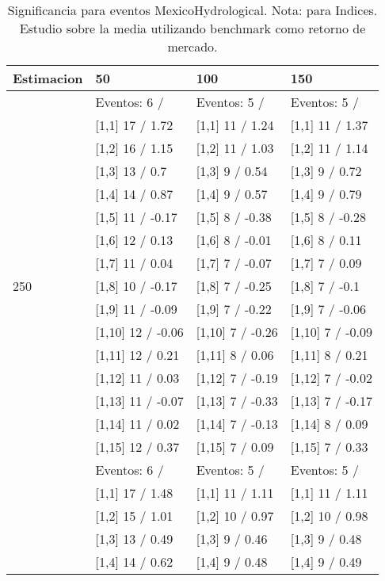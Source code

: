 \begin{table}

\caption{Significancia para eventos MexicoHydrological. Nota: para Indices. Estudio sobre la media utilizando benchmark como retorno de mercado.}
\centering
\begin{tabular}[t]{llll}
\toprule
Estimacion & 50 & 100 & 150\\
\midrule
 & Eventos:  6 / & Eventos:  5 / & Eventos:  5 /\\
 & {}[1,1] 17  / 1.72 & {}[1,1] 11  / 1.24 & {}[1,1] 11  / 1.37\\
 & {}[1,2] 16  / 1.15 & {}[1,2] 11  / 1.03 & {}[1,2] 11  / 1.14\\
 & {}[1,3] 13  / 0.7 & {}[1,3] 9  / 0.54 & {}[1,3] 9  / 0.72\\
 & {}[1,4] 14  / 0.87 & {}[1,4] 9  / 0.57 & {}[1,4] 9  / 0.79\\
\addlinespace
 & {}[1,5] 11  / -0.17 & {}[1,5] 8  / -0.38 & {}[1,5] 8  / -0.28\\
 & {}[1,6] 12  / 0.13 & {}[1,6] 8  / -0.01 & {}[1,6] 8  / 0.11\\
 & {}[1,7] 11  / 0.04 & {}[1,7] 7  / -0.07 & {}[1,7] 7  / 0.09\\
250 & {}[1,8] 10  / -0.17 & {}[1,8] 7  / -0.25 & {}[1,8] 7  / -0.1\\
 & {}[1,9] 11  / -0.09 & {}[1,9] 7  / -0.22 & {}[1,9] 7  / -0.06\\
\addlinespace
 & {}[1,10] 12  / -0.06 & {}[1,10] 7  / -0.26 & {}[1,10] 7  / -0.09\\
 & {}[1,11] 12  / 0.21 & {}[1,11] 8  / 0.06 & {}[1,11] 8  / 0.21\\
 & {}[1,12] 11  / 0.03 & {}[1,12] 7  / -0.19 & {}[1,12] 7  / -0.02\\
 & {}[1,13] 11  / -0.07 & {}[1,13] 7  / -0.33 & {}[1,13] 7  / -0.17\\
 & {}[1,14] 11  / 0.02 & {}[1,14] 7  / -0.13 & {}[1,14] 8  / 0.09\\
\addlinespace
 & {}[1,15] 12  / 0.37 & {}[1,15] 7  / 0.09 & {}[1,15] 7  / 0.33\\
 & Eventos:  6 / & Eventos:  5 / & Eventos:  5 /\\
 & {}[1,1] 17  / 1.48 & {}[1,1] 11  / 1.11 & {}[1,1] 11  / 1.11\\
 & {}[1,2] 15  / 1.01 & {}[1,2] 10  / 0.97 & {}[1,2] 10  / 0.98\\
 & {}[1,3] 13  / 0.49 & {}[1,3] 9  / 0.46 & {}[1,3] 9  / 0.48\\
\addlinespace
 & {}[1,4] 14  / 0.62 & {}[1,4] 9  / 0.48 & {}[1,4] 9  / 0.49\\

\end{tabular}
\end{table}
